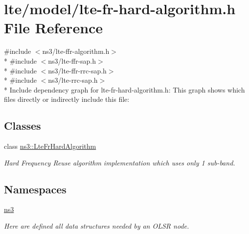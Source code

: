 \hypertarget{lte-fr-hard-algorithm_8h}{}\section{lte/model/lte-\/fr-\/hard-\/algorithm.h File Reference}
\label{lte-fr-hard-algorithm_8h}
{\ttfamily \#include $<$ns3/lte-\/ffr-\/algorithm.\+h$>$}\\*
{\ttfamily \#include $<$ns3/lte-\/ffr-\/sap.\+h$>$}\\*
{\ttfamily \#include $<$ns3/lte-\/ffr-\/rrc-\/sap.\+h$>$}\\*
{\ttfamily \#include $<$ns3/lte-\/rrc-\/sap.\+h$>$}\\*
Include dependency graph for lte-\/fr-\/hard-\/algorithm.h\+:
This graph shows which files directly or indirectly include this file\+:
\subsection*{Classes}
\begin{DoxyCompactItemize}
\item 
class \hyperlink{classns3_1_1LteFrHardAlgorithm}{ns3\+::\+Lte\+Fr\+Hard\+Algorithm}
\begin{DoxyCompactList}\small\item\em Hard Frequency Reuse algorithm implementation which uses only 1 sub-\/band. \end{DoxyCompactList}\end{DoxyCompactItemize}
\subsection*{Namespaces}
\begin{DoxyCompactItemize}
\item 
 \hyperlink{namespacens3}{ns3}
\begin{DoxyCompactList}\small\item\em Here are defined all data structures needed by an O\+L\+SR node. \end{DoxyCompactList}\end{DoxyCompactItemize}
